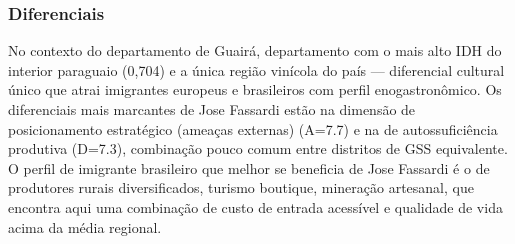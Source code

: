 \subsubsection*{Diferenciais}\label{dif-jose-fassardi-0410}
No contexto do departamento de Guairá, departamento com o mais alto IDH do interior paraguaio (0,704) e a única região vinícola do país — diferencial cultural único que atrai imigrantes europeus e brasileiros com perfil enogastronômico. Os diferenciais mais marcantes de Jose Fassardi estão na dimensão de posicionamento estratégico (ameaças externas) (A=7.7) e na de autossuficiência produtiva (D=7.3), combinação pouco comum entre distritos de GSS equivalente. O perfil de imigrante brasileiro que melhor se beneficia de Jose Fassardi é o de produtores rurais diversificados, turismo boutique, mineração artesanal, que encontra aqui uma combinação de custo de entrada acessível e qualidade de vida acima da média regional.
